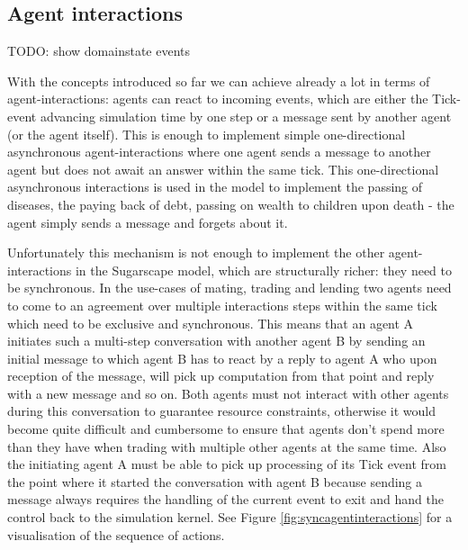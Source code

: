 \subsection{Agent interactions}
TODO: show domainstate events

With the concepts introduced so far we can achieve already a lot in terms of agent-interactions: agents can react to incoming events, which are either the Tick-event advancing simulation time by one step or a message sent by another agent (or the agent itself). This is enough to implement simple one-directional asynchronous agent-interactions where one agent sends a message to another agent but does not await an answer within the same tick. This one-directional asynchronous interactions is used in the model to implement the passing of diseases, the paying back of debt, passing on wealth to children upon death - the agent simply sends a message and forgets about it.

Unfortunately this mechanism is not enough to implement the other agent-interactions in the Sugarscape model, which are structurally richer: they need to be synchronous. In the use-cases of mating, trading and lending two agents need to come to an agreement over multiple interactions steps within the same tick which need to be exclusive and synchronous.  This means that an agent A initiates such a multi-step conversation with another agent B by sending an initial message to which agent B has to react by a reply to agent A who upon reception of the message, will pick up computation from that point and reply with a new message and so on. Both agents must not interact with other agents during this conversation to guarantee resource constraints, otherwise it would become quite difficult and cumbersome to ensure that agents don't spend more than they have when trading with multiple other agents at the same time. Also the initiating agent A must be able to pick up processing of its Tick event from the point where it started the conversation with agent B because sending a message always requires the handling of the current event to exit and hand the control back to the simulation kernel. See Figure \ref{fig:syncagentinteractions} for a visualisation of the sequence of actions.

